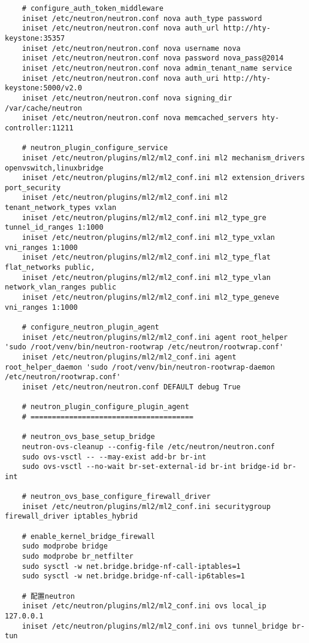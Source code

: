 \documentclass[a4paper,left=1.5cm,right=1.5cm,11pt]{article}
\begin{document}
\begin{lstlisting}
	# configure_auth_token_middleware
	iniset /etc/neutron/neutron.conf nova auth_type password
	iniset /etc/neutron/neutron.conf nova auth_url http://hty-keystone:35357
	iniset /etc/neutron/neutron.conf nova username nova
	iniset /etc/neutron/neutron.conf nova password nova_pass@2014
	iniset /etc/neutron/neutron.conf nova admin_tenant_name service
	iniset /etc/neutron/neutron.conf nova auth_uri http://hty-keystone:5000/v2.0
	iniset /etc/neutron/neutron.conf nova signing_dir /var/cache/neutron
	iniset /etc/neutron/neutron.conf nova memcached_servers hty-controller:11211

	# neutron_plugin_configure_service
	iniset /etc/neutron/plugins/ml2/ml2_conf.ini ml2 mechanism_drivers openvswitch,linuxbridge
	iniset /etc/neutron/plugins/ml2/ml2_conf.ini ml2 extension_drivers port_security
	iniset /etc/neutron/plugins/ml2/ml2_conf.ini ml2 tenant_network_types vxlan
	iniset /etc/neutron/plugins/ml2/ml2_conf.ini ml2_type_gre tunnel_id_ranges 1:1000
	iniset /etc/neutron/plugins/ml2/ml2_conf.ini ml2_type_vxlan vni_ranges 1:1000
	iniset /etc/neutron/plugins/ml2/ml2_conf.ini ml2_type_flat flat_networks public,
	iniset /etc/neutron/plugins/ml2/ml2_conf.ini ml2_type_vlan network_vlan_ranges public
	iniset /etc/neutron/plugins/ml2/ml2_conf.ini ml2_type_geneve vni_ranges 1:1000

	# configure_neutron_plugin_agent
	iniset /etc/neutron/plugins/ml2/ml2_conf.ini agent root_helper 'sudo /root/venv/bin/neutron-rootwrap /etc/neutron/rootwrap.conf'
	iniset /etc/neutron/plugins/ml2/ml2_conf.ini agent root_helper_daemon 'sudo /root/venv/bin/neutron-rootwrap-daemon /etc/neutron/rootwrap.conf'
	iniset /etc/neutron/neutron.conf DEFAULT debug True

	# neutron_plugin_configure_plugin_agent
	# ======================================

	# neutron_ovs_base_setup_bridge
	neutron-ovs-cleanup --config-file /etc/neutron/neutron.conf
	sudo ovs-vsctl -- --may-exist add-br br-int
	sudo ovs-vsctl --no-wait br-set-external-id br-int bridge-id br-int
	
	# neutron_ovs_base_configure_firewall_driver
	iniset /etc/neutron/plugins/ml2/ml2_conf.ini securitygroup firewall_driver iptables_hybrid
	
	# enable_kernel_bridge_firewall
	sudo modprobe bridge
	sudo modprobe br_netfilter
	sudo sysctl -w net.bridge.bridge-nf-call-iptables=1
	sudo sysctl -w net.bridge.bridge-nf-call-ip6tables=1

	# 配置neutron
	iniset /etc/neutron/plugins/ml2/ml2_conf.ini ovs local_ip 127.0.0.1
	iniset /etc/neutron/plugins/ml2/ml2_conf.ini ovs tunnel_bridge br-tun


\end{lstlisting}
\end{document}
